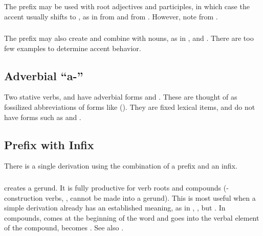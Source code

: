 \subsubsection{} The  prefix may be used with root adjectives
and participles, in which case the accent usually shifts to ,
as in   from   and
  from  .  However,
note   from  .
\label{lingop:prefix:ke}

\subsubsection{} The  prefix may also create and combine with
nouns, as in  , and 
.  There are too few examples to determine accent behavior.


\subsection{Adverbial ``a-''} Two stative verbs,  
and   have adverbial forms   and  .  These are
thought of as fossilized abbreviations of forms like  ().  They are fixed lexical items, and do
not have forms such as  and .


\subsection{Prefix with Infix} There is a single derivation using the
combination of a prefix and an infix.

\subsubsection{}  creates a gerund.  It is fully
productive for verb roots and compounds (-con\-struc\-tion verbs,
, cannot be made into a gerund).  This is
most useful when a simple  derivation already has an
established meaning, as in  ,  ,
but  .  In compounds,  comes at the
beginning of the word and  goes into the verbal element of the
compound,  becomes . See also
.
\label{lingop:gerund}


